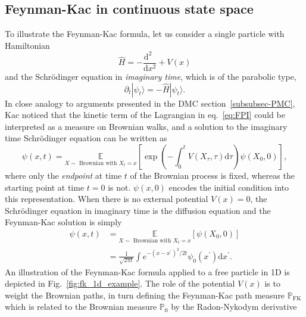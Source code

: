 \subsection{Feynman-Kac in continuous state space}
\label{subsec:FK_in_continuous_space}
To illustrate the Feynman-Kac formula, let us consider a single particle with Hamiltonian
\begin{equation}
	\hat{H} = -\frac{\mathrm{d}^2~~}{\mathrm{d}x^2} + V(x)
\end{equation}
and the Schr\" odinger equation in \textit{imaginary time}, which is of the parabolic type, 
\begin{equation}
	\label{eq:imag_sch}
	\partial_t | \psi_t \rangle = - \hat{H} | \psi_t \rangle.
\end{equation}
In close analogy to arguments presented in the DMC section~\ref{subsubsec-PMC}, Kac noticed that the kinetic term of the Lagrangian in eq.~\eqref{eq:FPI} could be interpreted as a measure on Brownian walks, and a solution to the imaginary time Schr\" odinger equation can be written as
\begin{equation}
	\label{eq:fkac}
	\psi(x, t)=\underset{X \sim \text { Brownian with } X_{t}=x}{\mathbb{E}}
	\left[\exp \left(-\int_{0}^{t}  V\left(X_{\tau}, \tau \right) \mathrm{d}\tau \right) \psi\left(X_{0}, 0\right)\right],
\end{equation}
where only the \emph{endpoint} at time $t$ of the Brownian process is fixed, whereas the starting point at time $t=0$ is not. $\psi (x, 0)$ encodes the initial condition into this representation. When there is no external potential $V(x) = 0$, the Schr\" odinger equation in imaginary time is the diffusion equation and the Feynman-Kac solution is simply
\begin{equation}
	\begin{aligned} 
		\psi(x, t) &= \underset{X \sim \text { Brownian with } X_{t}=x}{\mathbb{E}}\left[\psi\left(X_{0}, 0\right)\right] \\
		&=  
		\frac{1}{\sqrt{2 \pi t}} \int  e^{-\left(x-x^{\prime}\right)^{2} / 2 t} \psi_{0}\left(x^{\prime}\right) \mathrm{d} x^{\prime}.
	\end{aligned}
\end{equation}
An illustration of the Feynman-Kac formula applied to a free particle in 1D is depicted in Fig.~\ref{fig:fk_1d_example}. The role of the potential $V(x)$ is to weight the Brownian paths, in turn defining the Feynman-Kac {path measure} $\mathbb{P}_{\mathrm{FK}}$ which is related to the Brownian measure $\mathbb{P}_{0}$ by the Radon-Nykodym derivative
